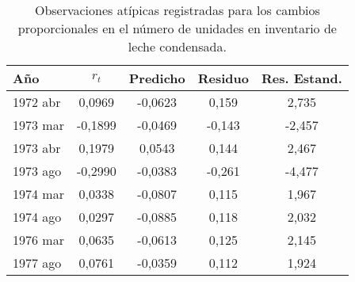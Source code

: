 \documentclass[]{article}
\newenvironment{Shaded}{\begin{snugshade}}{\end{snugshade}}
\newcommand{\DataTypeTok}[1]{\textcolor[rgb]{0.13,0.29,0.53}{#1}}
\newcommand{\DecValTok}[1]{\textcolor[rgb]{0.00,0.00,0.81}{#1}}
\newcommand{\FloatTok}[1]{\textcolor[rgb]{0.00,0.00,0.81}{#1}}
\newcommand{\KeywordTok}[1]{\textcolor[rgb]{0.13,0.29,0.53}{\textbf{#1}}}
\newcommand{\NormalTok}[1]{#1}
\newcommand{\OperatorTok}[1]{\textcolor[rgb]{0.81,0.36,0.00}{\textbf{#1}}}
\newcommand{\OtherTok}[1]{\textcolor[rgb]{0.56,0.35,0.01}{#1}}
\newcommand{\StringTok}[1]{\textcolor[rgb]{0.31,0.60,0.02}{#1}}
\begin{document}
\begin{Shaded}
\end{Shaded}

\begin{table}

\caption{\label{tab:outliers}Observaciones atípicas registradas para los cambios proporcionales en el número de unidades en inventario de leche condensada.}
\centering
\begin{tabular}[t]{l|c|c|c|c}
\hline
Año & $r_t$ & Predicho & Residuo & Res. Estand.\\
\hline
1972 abr & 0,0969 & -0,0623 & 0,159 & 2,735\\
\hline
1973 mar & -0,1899 & -0,0469 & -0,143 & -2,457\\
\hline
1973 abr & 0,1979 & 0,0543 & 0,144 & 2,467\\
\hline
1973 ago & -0,2990 & -0,0383 & -0,261 & -4,477\\
\hline
1974 mar & 0,0338 & -0,0807 & 0,115 & 1,967\\
\hline
1974 ago & 0,0297 & -0,0885 & 0,118 & 2,032\\
\hline
1976 mar & 0,0635 & -0,0613 & 0,125 & 2,145\\
\hline
1977 ago & 0,0761 & -0,0359 & 0,112 & 1,924\\
\hline
\end{tabular}
\end{table}
\end{document}
